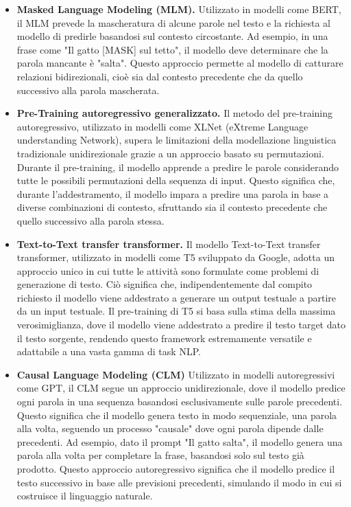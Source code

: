 \documentclass[target=mst,aauheader=,style=]{thud}
\begin{document}
\begin{itemize}
    \item \textbf{Masked Language Modeling (MLM).} Utilizzato in modelli come BERT, il MLM prevede la mascheratura di alcune parole nel testo e la richiesta al modello di predirle basandosi sul contesto circostante. Ad esempio, in una frase come "Il gatto [MASK] sul tetto", il modello deve determinare che la parola mancante è "salta". Questo approccio permette al modello di catturare relazioni bidirezionali, cioè sia dal contesto precedente che da quello successivo alla parola mascherata.
    \item \textbf{Pre-Training autoregressivo generalizzato.} Il metodo del pre-training autoregressivo, utilizzato in modelli come XLNet (eXtreme Language understanding Network), supera le limitazioni della modellazione linguistica tradizionale unidirezionale grazie a un approccio basato su permutazioni. Durante il pre-training, il modello apprende a predire le parole considerando tutte le possibili permutazioni della sequenza di input. Questo significa che, durante l'addestramento, il modello impara a predire una parola in base a diverse combinazioni di contesto, sfruttando sia il contesto precedente che quello successivo alla parola stessa.
    \item \textbf{Text-to-Text transfer transformer.} Il modello Text-to-Text transfer transformer, utilizzato in modelli come T5 sviluppato da Google, adotta un approccio unico in cui tutte le attività sono formulate come problemi di generazione di testo. Ciò significa che, indipendentemente dal compito richiesto il modello viene addestrato a generare un output testuale a partire da un input testuale. Il pre-training di T5 si basa sulla stima della massima verosimiglianza, dove il modello viene addestrato a predire il testo target dato il testo sorgente, rendendo questo framework estremamente versatile e adattabile a una vasta gamma di task NLP.
    \item \textbf{Causal Language Modeling (CLM)} Utilizzato in modelli autoregressivi come GPT, il CLM segue un approccio unidirezionale, dove il modello predice ogni parola in una sequenza basandosi esclusivamente sulle parole precedenti. Questo significa che il modello genera testo in modo sequenziale, una parola alla volta, seguendo un processo "causale" dove ogni parola dipende dalle precedenti. Ad esempio, dato il prompt "Il gatto salta", il modello genera una parola alla volta per completare la frase, basandosi solo sul testo già prodotto. Questo approccio autoregressivo significa che il modello predice il testo successivo in base alle previsioni precedenti, simulando il modo in cui si costruisce il linguaggio naturale.
\end{itemize}
\end{document}

